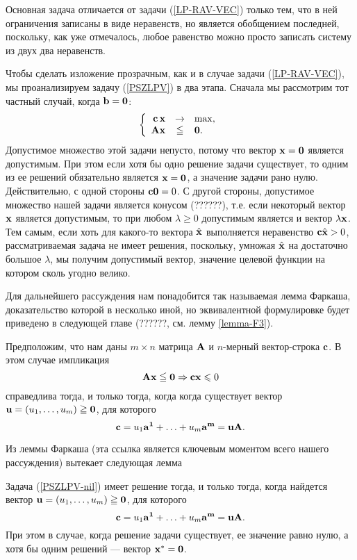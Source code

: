 Основная задача отличается от задачи (\ref{LP-RAV-VEC}) только тем,
что в ней ограничения записаны в виде неравенств, но является
обобщением последней, поскольку, как уже отмечалось, любое равенство
можно просто записать систему из двух два неравенств.

Чтобы сделать изложение прозрачным, как и в случае задачи
(\ref{LP-RAV-VEC}), мы проанализируем задачу (\ref{PSZLPV}) в два
этапа. Сначала мы рассмотрим тот частный случай, когда
$\mathbf{b}=\mathbf{0}$:
\begin{equation}\label{PSZLPV-nil}
\left\{
\begin{array}{rcl}
 \mathbf{c} \, \mathbf{x} & \to& \max,  \\
 \mathbf{A} \mathbf{x} &\leqq &\mathbf{0}. \\
 \end{array} \right.
\end{equation}
Допустимое множество этой задачи непусто, потому что вектор
$\mathbf{x}=\mathbf{0}$ является допустимым. При этом если хотя бы одно
решение задачи существует, то одним из ее решений обязательно
является $\mathbf{x}=\mathbf{0}$, а значение задачи рано нулю.
Действительно, с одной стороны $\mathbf{c}\mathbf{0}=0$. С другой стороны,
допустимое множество нашей задачи является конусом (??????), т.е.
если некоторый вектор $\mathbf{x}$ является допустимым, то при любом
$\lambda\geqslant0$ допустимым является и вектор $\lambda\mathbf{x}$.
Тем самым, если хоть для какого-то вектора $\hat{\mathbf{x}}$
выполняется неравенство $\mathbf{c}\hat{\mathbf{x}}>0$, рассматриваемая
задача не имеет решения, поскольку, умножая $\hat{\mathbf{x}}$ на
достаточно большое $\lambda$, мы получим допустимый вектор, значение
целевой функции на котором сколь угодно велико.

    Для дальнейшего рассуждения нам понадобится так называемая лемма
    Фаркаша, доказательство  которой в несколько иной, но эквивалентной формулировке
    будет приведено в следующей главе (??????, см. лемму \ref{lemma-F3}).

\begin{lem}
    Предположим, что нам даны $m \times n$ матрица $\mathbf{A}$ и $n$-мерный
    вектор-строка $\mathbf{c}$. В этом случае импликация
    \[\mathbf{A} \mathbf{x} \leqq \mathbf{0} \Rightarrow \mathbf{c}\mathbf{x}\leqslant0\]
    справедлива тогда, и только тогда, когда когда существует вектор
    $\mathbf{u}=(u_{1},\ldots,u_{m})\geqq\mathbf{0}$, для которого
    \[\mathbf{c}=u_{1}\mathbf{a^{1}}+\ldots+u_{m}\mathbf{a^{m}}=\mathbf{u}\mathbf{A}.\]
\end{lem}




    Из леммы Фаркаша (эта ссылка является ключевым моментом всего нашего рассуждения)
    вытекает следующая лемма
\begin{lem}
    \label{fredgolm-0-neravenstvo}
    Задача (\ref{PSZLPV-nil}) имеет решение тогда, и только тогда, когда найдется вектор
    $\mathbf{u}=(u_{1},\ldots,u_{m})\geqq\mathbf{0}$, для которого
    \[\mathbf{c}=u_{1}\mathbf{a^{1}}+\ldots+u_{m}\mathbf{a^{m}}=\mathbf{u}\mathbf{A}.\]
       При этом в случае, когда решение задачи
    существует, ее значение равно нулю, а хотя бы одним решений ---
    вектор $\mathbf{x^{*}}=\mathbf{0}$.
\end{lem}

